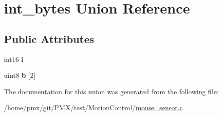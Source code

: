 \hypertarget{unionint__bytes}{}\section{int\+\_\+bytes Union Reference}
\label{unionint__bytes}
\subsection*{Public Attributes}
\begin{DoxyCompactItemize}
\item 
\mbox{\label{unionint__bytes_ab6bacba3c118af17d96765339ccbcddc}} 
int16 {\bfseries i}
\item 
\mbox{\label{unionint__bytes_a9b6f0d435e436a0238f2cd82aeaf3456}} 
uint8 {\bfseries b} \mbox{[}2\mbox{]}
\end{DoxyCompactItemize}


The documentation for this union was generated from the following file\+:\begin{DoxyCompactItemize}
\item 
/home/pmx/git/\+P\+M\+X/test/\+Motion\+Control/\hyperlink{mouse__sensor_8c}{mouse\+\_\+sensor.\+c}\end{DoxyCompactItemize}
